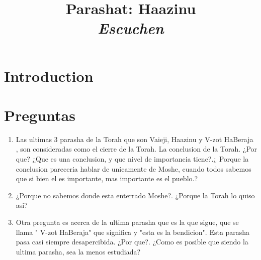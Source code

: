 \documentclass[conference]{IEEEtran}
\title{Parashat: Haazinu \\ \textit{Escuchen}}
\author{\IEEEauthorblockN{Kunst, James Jules Waldemar}
\IEEEauthorblockA{Bet-Melej Haba}}
\begin{document}
\maketitle


\section{Introduction}



\section{Preguntas}

\begin{enumerate}
\item

Las ultimas 3 parasha de la Torah que son Vaieji, Haazinu y V-zot HaBeraja  , son consideradas como el cierre de la Torah. La conclusion  de la Torah. ¿Por que? ¿Que es una conclusion, y que nivel de importancia tiene?.¿ Porque la conclusion pareceria hablar de unicamente de Moshe, cuando todos sabemos que si bien el es importante, mas importante es el pueblo.?
\item
¿Porque no sabemos donde esta enterrado Moshe?. ¿Porque la Torah lo quiso asi?
\item
Otra pregunta es acerca de la ultima parasha que es la que sigue, que se llama " V-zot HaBeraja" que significa y "esta es la bendicion". Esta parasha pasa casi siempre desapercibida. ¿Por que?.  ¿Como es posible que siendo la ultima parasha, sea  la  menos estudiada?
\end{enumerate}
\end{document}
